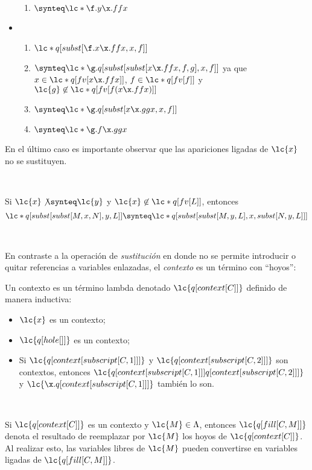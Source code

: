 \begin{ejemplo}
\begin{itemize}
\begin{enumerate}
    \item \(\synteq \lc*{\f.y\x.f f x}\)
    \end{enumerate}
  \item \begin{enumerate}
    \item \(\lc*{q[subst[\f.x\x.f f x, x, f]]}\)
    \item \(\synteq \lc*{\g.q[subst[subst[x\x.f f x, f, g], x, f]]}\) ya que
      \(x\in \lc*{q[fv[x\x.f f x]]}\), \(f\in \lc*{q[fv[f]]}\) y \(\lc{g}\not\in
      \lc*{q[fv[f (x\x.f f x)]]}\)
    \item \(\synteq \lc*{\g.q[subst[x\x.g g x, x, f]]}\)
    \item \(\synteq \lc*{\g.f\x.g g x}\)
    \end{enumerate}
  \end{itemize}

  En el último caso es importante observar que las apariciones ligadas de
  \(\lc{x}\) no se sustituyen.
\end{ejemplo} \

\begin{lema}
  Si \(\lc{x} \not\synteq \lc{y}\) y \(\lc{x}\not\in \lc*{q[fv[L]]}\), entonces
  \[\lc*{q[subst[subst[M,x,N],y,L]]} \synteq \lc*{q[subst[subst[M,y,L],x,subst[N,y,L]]]}\]
\end{lema} \

En contraste a la operación de \emph{sustitución} en donde no se permite
introducir o quitar referencias a variables enlazadas, el \emph{contexto} es un
término con ``hoyos'': \\

\begin{defi}[Contexto] Un contexto es un término lambda denotado
  \(\lc{q[context[C]]}\) definido de manera inductiva:
  \label{definicion:contexto}
  \begin{itemize}
  \item \(\lc{x}\) es un contexto;
  \item \(\lc{q[hole[]]}\) es un contexto;
  \item Si \(\lc{q[context[subscript[C,1]]]}\) y
    \(\lc{q[context[subscript[C,2]]]}\) son contextos, entonces
    \(\lc{q[context[subscript[C,1]]] q[context[subscript[C,2]]]}\) y
    \(\lc{\x.q[context[subscript[C,1]]]}\) también lo son.
  \end{itemize}
\end{defi} \

Si \(\lc{q[context[C]]}\) es un contexto y \(\lc{M} \in \Lambda\), entonces
\(\lc{q[fill[C,M]]}\) denota el resultado de reemplazar por \(\lc{M}\) los hoyos
de \(\lc{q[context[C]]}\). Al realizar esto, las variables libres de \(\lc{M}\)
pueden convertirse en variables ligadas de \(\lc{q[fill[C,M]]}\). \\

